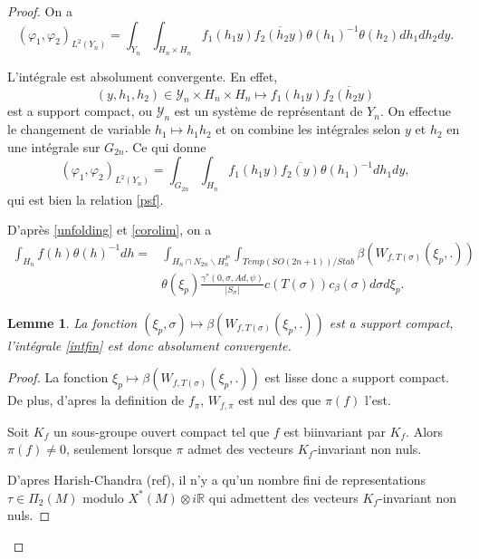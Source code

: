 \documentclass{amsart}
\newtheorem{lemme}{Lemme}[section]
\begin{document}
\begin{proof}
On a
\begin{equation}
(\varphi_1, \varphi_2)_{L^2(Y_n)} = \int_{Y_n} \int_{H_n \times H_n} f_1(h_1 y) \overline{f_2(h_2 y)} \theta(h_1)^{-1} \theta(h_2) dh_1 dh_2 dy.
\end{equation}

L'intégrale est absolument convergente. En effet,
\begin{equation}
(y,h_1,h_2) \in \mathcal{Y}_n \times H_n \times H_n \mapsto f_1(h_1 y) \overline{f_2(h_2 y)}
\end{equation}
est a support compact, ou $\mathcal{Y}_n$ est un système de représentant de $Y_n$.
On effectue le changement de variable $h_1 \mapsto h_1h_2$ et on combine les intégrales selon $y$ et $h_2$ en une intégrale sur $G_{2n}$. Ce qui donne
\begin{equation}
(\varphi_1, \varphi_2)_{L^2(Y_n)} = \int_{G_{2n}} \int_{H_n} f_1(h_1 y) \overline{f_2(y)} \theta(h_1)^{-1} dh_1 dy,
\end{equation}
qui est bien la relation \ref{psf}.

D'après \ref{unfolding} et \ref{corolim}, on a
\begin{equation}
\label{intfin}
\begin{split}
\int_{H_n} f(h) \theta(h)^{-1} dh = &\int_{H_n \cap N_{2n} \backslash H^P_n} \int_{Temp(SO(2n+1))/Stab} \beta\left(W_{f,T(\sigma)}(\xi_p,.)\right) \\
& \theta(\xi_p) \frac{\gamma^*(0, \sigma, Ad, \psi)}{|S_\sigma|}c(T(\sigma))c_\beta(\sigma) d\sigma d\xi_p.
\end{split}
\end{equation}

\begin{lemme}
La fonction $(\xi_p, \sigma) \mapsto \beta\left(W_{f,T(\sigma)}(\xi_p,.)\right)$ est a support compact, l'intégrale \ref{intfin} est donc absolument convergente.
\end{lemme}

\begin{proof}
La fonction $\xi_p \mapsto \beta\left(W_{f,T(\sigma)}(\xi_p,.)\right)$ est lisse donc a support compact. De plus, d'apres la definition de $f_\pi$, $W_{f,\pi}$ est nul des que $\pi(f)$ l'est.

Soit $K_f$ un sous-groupe ouvert compact tel que $f$ est biinvariant par $K_f$. Alors $\pi(f) \neq 0$, seulement lorsque $\pi$ admet des vecteurs $K_f$-invariant non nuls.

D'apres Harish-Chandra (ref), il n'y a qu'un nombre fini de representations $\tau \in \Pi_2(M)$ modulo $X^*(M) \otimes i\mathbb{R}$ qui admettent des vecteurs $K_f$-invariant non nuls.


\end{proof}
\end{proof}
\end{document}
